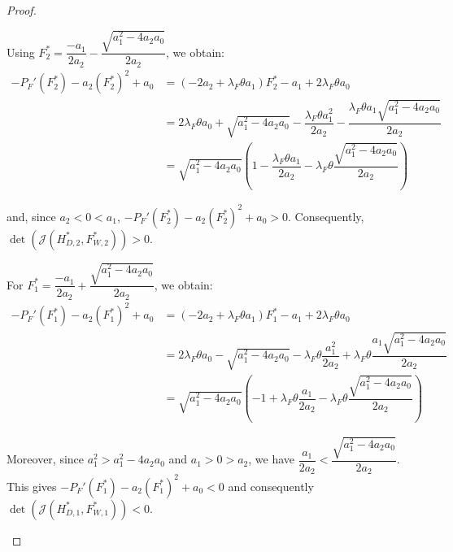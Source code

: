 \documentclass{article}
\newcommand{\lfw}{\lambda_{F}}
\newcommand{\lfw}{\lambda_{F}}
\begin{document}
\begin{proof}
\begin{itemize}
\begin{itemize}
Using $F_2^* = \dfrac{-a_1}{2a_2} - \dfrac{\sqrt{a_1^2 - 4a_2a_0}}{2a_2}$, we obtain:
\begin{align*}
- P_F'(F_2^*) - a_2(F_2^*)^2  + a_0  &=(-2a_2 + \lfw \theta a_1) F_2^* -a_1 + 2\lfw \theta a_0\\
&= 2\lfw \theta a_0 + \sqrt{a_1^2 - 4a_2a_0} - \dfrac{\lfw \theta a_1^2}{2a_2} - \dfrac{\lfw \theta a_1\sqrt{a_1^2 - 4a_2a_0}}{2a_2}\\
&=\sqrt{a_1^2 - 4a_2a_0} \left(1 - \dfrac{\lfw \theta a_1}{2a_2} - \lfw \theta\dfrac{\sqrt{a_1^2 - 4a_2a_0}}{2a_2} \right)
\end{align*}

and, since $a_2 <0 < a_1$, $- P_F'(F_2^*) - a_2(F_2^*)^2  + a_0 > 0$.
Consequently, $\det(\mathcal{J}(H_{D,2}^*, F_{W,2}^*)) > 0$.


For $F_1^* = \dfrac{-a_1}{2a_2} + \dfrac{\sqrt{a_1^2 - 4a_2a_0}}{2a_2}$, we obtain:
\begin{align*}
- P_F'(F_1^*) - a_2(F_1^*)^2  + a_0  &=(-2a_2 + \lfw \theta a_1) F_1^* -a_1 + 2\lfw \theta a_0\\
&= 2\lfw \theta a_0 - \sqrt{a_1^2 - 4a_2a_0} - \lfw \theta \dfrac{a_1^2}{2a_2} + \lfw \theta \dfrac{a_1\sqrt{a_1^2 - 4a_2a_0}}{2a_2}\\
&=\sqrt{a_1^2 - 4a_2a_0} \left(-1 + \lfw \theta \dfrac{a_1}{2a_2} - \lfw \theta \dfrac{\sqrt{a_1^2 - 4a_2a_0}}{2a_2} \right)
\end{align*}

Moreover, since $a_1^2 > a_1^2 - 4a_2 a_0$ and $a_1 > 0 > a_2$, we have $\dfrac{a_1}{2a_2} < \dfrac{\sqrt{a_1^2 - 4 a_2 a_0}}{2a_2}$. This gives  $- P_F'(F_1^*) - a_2(F_1^*)^2  + a_0 < 0$ and consequently $\det(\mathcal{J}(H_{D,1}^*, F_{W,1}^*)) < 0$.

\end{itemize}


\end{itemize}
\end{proof}
\end{document}
